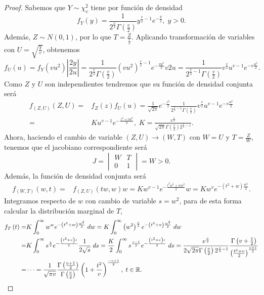 \begin{proof}
Sabemos que $\displaystyle Y \sim \chi^{2}_{v} $ tiene por función de densidad
\[f_{Y}\left(y\right)=\frac{1}{2^{\frac{v}{2}}\Gamma\left(\frac{v}{2}\right)}y^{\frac{v}{2}-1}e^{-\frac{y}{2}}, \; y > 0 .\]
Además, $\displaystyle Z \sim N\left(0,1\right) $, por lo que $\displaystyle T = \frac{Z}{\frac{Y}{v}} $. Aplicando transformación de variables con $\displaystyle U = \sqrt{\frac{Y}{v}} $, obtenemos 
\[f_{U}\left(u\right)=f_{Y}\left(vu^{2}\right) \left|\frac{2y}{2u}\right|= \frac{1}{2^{\frac{v}{2}}\Gamma\left(\frac{v}{2}\right)}\left(vu^{2}\right)^{\frac{v}{2}-1}e^{-\frac{vu^{2}}{2}}v2u = 
\frac{1}{2^{\frac{v}{2}-1}\Gamma\left(\frac{v}{2}\right)}v^{\frac{v}{2}}u^{v-1}e^{-v\frac{u^{2}}{2}}.\]
Como $\displaystyle Z $ y $\displaystyle U $ son independientes tendremos que su función de densidad conjunta será
\[
\begin{split}
	f_{\left(Z,U\right)}\left(Z,U\right)= & f_{Z}\left(z\right)f_{U}\left(u\right)= \frac{1}{\sqrt{2\pi }}e^{-\frac{z^{2}}{2}}\frac{1}{2^{\frac{v}{2}-1}\Gamma\left(\frac{v}{2}\right)}v^{\frac{v}{2}}u^{v-1}e^{-v\frac{u^{2}}{2}}\\
	= & Ku^{v-1}e^{-\frac{z^{2}+vu^{2}}{2}}, \; K = \frac{v^{\frac{u}{2}}}{\sqrt{2\pi }\Gamma\left(\frac{v}{2}\right)2^{\frac{v}{2}-1}} .
\end{split}
\]
Ahora, haciendo el cambio de variable $\displaystyle \left(Z,U\right)\to \left(W,T\right) $ con $\displaystyle W = U $ y $\displaystyle T=\frac{Z}{W} $, tenemos que el jacobiano correspondiente será
\[J = \begin{vmatrix} W & T \\ 0 & 1 \end{vmatrix} = W > 0 .\]
Además, la función de densidad conjunta será
\[
\begin{split}
	f_{\left(W,T\right)}\left(w,t\right) = & f_{\left(Z,U\right)}\left(tw, w\right)w = Kw^{v-1}e^{-\frac{t ^{2}w^{2}+w w^{2}}{2}}w = Kw^{v}e^{-\left(t ^{2}+w\right)\frac{w^{2}}{2}}.
\end{split}
\]
Integramos respecto de $\displaystyle w $ con cambio de variable $\displaystyle s = w^{2} $, para de esta forma calcular la distribución marginal de $\displaystyle T $,
\[
\begin{split}
	f_{T}\left(t\right)= & K\int^{\infty}_{0} w^{w}e^{-\left(t ^{2}+w\right)\frac{w^{2}}{2}} \; dw = K\int^{\infty}_{0} \left(w^{2}\right)^{\frac{v}{2}}e^{-\left(t ^{2}+v\right)\frac{w^{2}}{2}} \; dw \\
	= & K\int^{\infty}_{0} s^{\frac{v}{2}}e^{-\frac{\left(t ^{2}+v\right)s}{2}}\frac{1}{2\sqrt{s}} \; d s = \frac{K}{2}\int^{\infty}_{0} s^{\frac{v-1}{2}}e^{-\frac{\left(t ^{2}+v\right)s}{2}} \; d s = \frac{v^{\frac{v}{2}}}{2\sqrt{2\pi }\Gamma\left(\frac{v}{2}\right)2^{\frac{v}{2}-1}}\frac{\Gamma\left(v + \frac{1}{2}\right)}{\left(\frac{t ^{2}+v}{2}\right)^{ \frac{v+1}{2}}} \\
	= & \cdots = \frac{1}{\sqrt{\pi v}}\frac{\Gamma\left(\frac{v+1}{2}\right)}{\Gamma\left(\frac{v}{2}\right)}\left(1 + \frac{t ^{2}}{v}\right)^{\frac{-v+1}{2}}, \; t \in \mathbb{R}.
\end{split}
\]
\end{proof}
